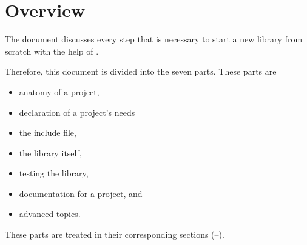 %                                                                        
%                                                                        
%                                                                        
%                                                                        
%
\clearpage
\section{Overview}

The document discusses every step that is necessary to start a new library from scratch with the help of \projectname.

Therefore, this document is divided into the seven parts. These parts are

\begin{itemize}
\item anatomy of a \projectname project,
\item declaration of a \projectname project's needs
\item the include file,
\item the library itself,
\item testing the library,
\item documentation for a \projectname project, and
\item advanced topics.
\end{itemize}

These parts are treated in their corresponding sections (--).
